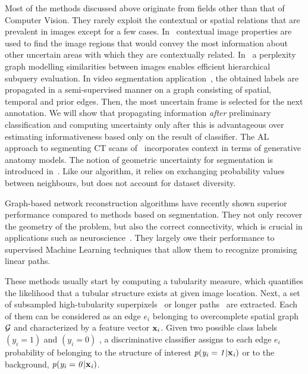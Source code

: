\documentclass[10pt,twocolumn,letterpaper]{article}
\begin{document}
Most of  the methods discussed above  originate from fields other  than that of Computer
Vision.   They rarely  exploit  the  contextual or  spatial  relations that  are
prevalent      in     images      except     for      a     few      cases.
In~\cite{Siddiquie10} contextual  image properties are used  to find
the image regions  that would convey the most information  about other uncertain
areas       with      which       they      are       contextually      related. In~\cite{Aodha2014} a perplexity graph modelling similarities between images enables efficient hierarchical subquery evaluation.  In video segmentation application~\cite{Fathi11},  the obtained labels are propagated in a semi-supervised manner on a graph consisting of spatial, temporal and  prior edges. Then, the most uncertain frame is selected for the next annotation. We will show that propagating information \textit{after} preliminary classification and computing uncertainty only after this is advantageous over estimating informativeness based only on the result of classifier.  The AL approach to segmenting CT scans
of~\cite{Iglesias11} incorporates context  in  terms  of generative  anatomy
models.   The notion  of geometric  uncertainty for  segmentation is  introduced
in~\cite{Konyushkova15}.    Like  our   algorithm,  it   relies  on   exchanging
probability values between neighbours, but  does not account for dataset diversity. 



Graph-based  network  reconstruction  algorithms have  recently  shown  superior
performance compared to methods based on segmentation. They not only recover the
geometry of the problem, but also  the correct connectivity, which is crucial in
applications                               such                               as
neuroscience~\cite{Santamaria-Pang15,Wegner15,Montoya-Zegarra14,Turetken12,Turetken13a,neher2015}. They
largely owe their performance to supervised Machine Learning techniques
  that allow them to recognize promising linear paths.

These methods usually start by  computing a tubularity measure, which quantifies
the likelihood that a tubular structure  exists at given image location. Next, a
set                 of                subsampled                 high-tubularity
superpixels~\cite{Santamaria-Pang15,Wegner15,Montoya-Zegarra14}   or   longer
paths~\cite{Turetken12,Turetken13a,Breitenreicher13,neher2015}   are  extracted.
Each  of them  can be  considered  as an  edge $e_i$  belonging to  overcomplete
spatial  graph $\mathcal{G}$  and characterized  by a  feature vector  $\mathbf{x}_i$. Given two possible class labels $\mathit{(y_i = 1)}$ and $\mathit{(y_i = 0)}$  , a
discriminative  classifier assigns  to each  edge $\mathit{e_i}$  probability of
belonging to the structure of  interest $\mathit{p(y_i = 1|\mathbf{x}_i)}$ or to
the background, $\mathit{p(y_i = 0|\mathbf{x}_i)}$.
\end{document}
